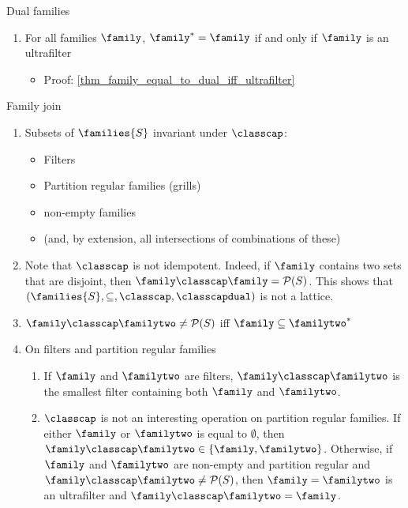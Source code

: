 
Dual families
\begin{enumerate}
    \item For all families $\family$, $\family^* = \family$ if and only if $\family$ is an ultrafilter
    \begin{itemize}
        \item Proof: \cref{thm_family_equal_to_dual_iff_ultrafilter}
    \end{itemize}
\end{enumerate}

Family join
\begin{enumerate}
    \item Subsets of $\families{S}$ invariant under $\classcap$:
    \begin{itemize}
        \item Filters
        \item Partition regular families (grills)
        \item non-empty families
        \item (and, by extension, all intersections of combinations of these)
    \end{itemize}
    
    \item Note that $\classcap$ is not idempotent.  Indeed, if $\family$ contains two sets that are disjoint, then $\family \classcap \family = \mathcal{P}(S)$.  This shows that $(\families{S},\subseteq,\classcap,\classcapdual)$ is not a lattice.
    
    \item $\family \classcap \familytwo \neq \mathcal{P}(S)$ iff $\family \subseteq \familytwo^*$  
        
    \item On filters and partition regular families
    \begin{enumerate}
        \item If $\family$ and $\familytwo$ are filters, $\family \classcap \familytwo$ is the smallest filter containing both $\family$ and $\familytwo$.

        \item $\classcap$ is not an interesting operation on partition regular families.  If either $\family$ or $\familytwo$ is equal to $\emptyset$, then $\family \classcap \familytwo \in \{\family, \familytwo\}$.  Otherwise, if $\family$ and $\familytwo$ are non-empty and partition regular and $\family \classcap \familytwo \neq \mathcal{P}(S)$, then $\family = \familytwo$ is an ultrafilter and $\family \classcap \familytwo = \family$.


\end{enumerate}
\end{enumerate}
